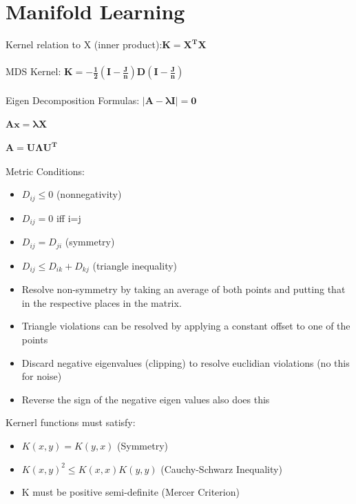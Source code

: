 \documentclass{article}
\begin{document}
\section{Manifold Learning}
Kernel relation to X (inner product):$\mathbf{K = X^TX}$\\\\
MDS Kernel: $\mathbf{K=-\frac{1}{2}(I-\frac{J}{n})D(I-\frac{J}{n})}$\\\\
Eigen Decomposition Formulas: $\mathbf{|A-\lambda I|=0}$\\\\
$\mathbf{Ax=\lambda X}$\\\\
$\mathbf{A=U\Lambda U^T}$\\\\
Metric Conditions:
\begin{itemize}
	\item $D_{ij}\leq0$ (nonnegativity)
	\item $D_{ij} = 0$ iff i=j 
	\item $D_{ij} = D_{ji}$ (symmetry)
	\item $D_{ij}\leq D_{ik}+D_{kj}$ (triangle inequality)
\end{itemize}
\begin{itemize}
	\item Resolve non-symmetry by taking an average of both points and putting that in the respective places in the matrix.
	\item Triangle violations can be resolved by applying a constant offset to one of the points
	\item Discard negative eigenvalues (clipping) to resolve euclidian violations (no this for noise)
	\item Reverse the sign of the negative eigen values also does this 
\end{itemize}
Kernerl functions must satisfy:
\begin{itemize}
	\item $K(x,y) = K(y,x)$ (Symmetry)
	\item $K(x,y)^2 \leq K(x,x)K(y,y)$ (Cauchy-Schwarz Inequality)
	\item K must be positive semi-definite (Mercer Criterion)
\end{itemize}
\end{document}
